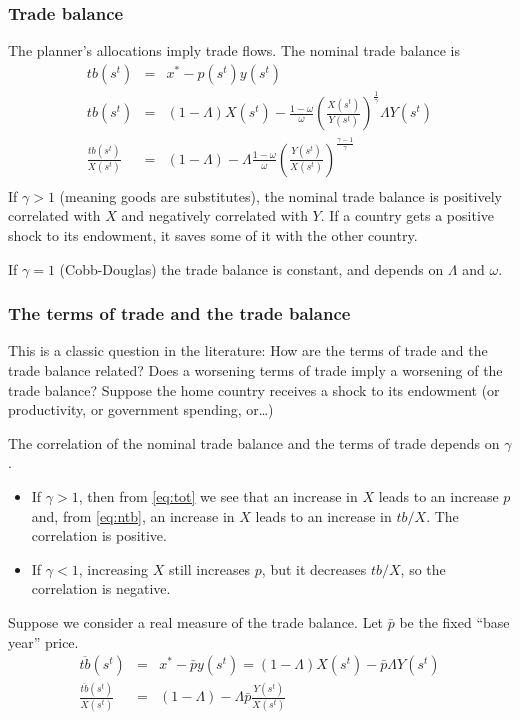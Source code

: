 \documentclass[11pt,pdftex,twoside,letterpaper]{exam}
\begin{document}
\subsubsection{Trade balance}
The planner's allocations imply trade flows. The nominal trade balance is
\begin{eqnarray}
  tb(s^t) &=& x^*-p(s^t)y(s^t)\\
  tb(s^t) &=& (1-\Lambda)X(s^t)-\frac{1-\omega}{\omega}\left(\frac{X(s^t)}{Y(s^t)}\right)^{\frac{1}{\gamma}}\Lambda Y(s^t)\\
  \frac{tb(s^t)}{X(s^t)} &=& (1-\Lambda)-\Lambda\frac{1-\omega}{\omega}\left(\frac{Y(s^t)}{X(s^t)}\right)^{\frac{\gamma-1}{\gamma}}\label{eq:ntb}\\
\end{eqnarray}
If $\gamma>1$ (meaning goods are substitutes), the nominal trade balance is positively correlated with $X$ and negatively correlated with $Y$.  If a country gets a positive shock to its endowment, it saves some of it with the other country.

If $\gamma=1$ (Cobb-Douglas) the trade balance is constant, and depends on $\Lambda$ and $\omega$.

\subsubsection{The terms of trade and the trade balance}
This is a classic question in the literature: How are the terms of trade and the trade balance related?  Does a worsening terms of trade imply a worsening of the trade balance? Suppose the home country receives a shock to its endowment (or productivity, or government spending, or\ldots)

The correlation of the nominal trade balance and the terms of trade depends on $\gamma$.
\begin{itemize}
\item If $\gamma>1$, then from \eqref{eq:tot} we see that an increase in $X$ leads to an increase $p$ and, from \eqref{eq:ntb}, an increase in $X$ leads to an increase in $tb/X$. The correlation is positive.

    \item If $\gamma <1$, increasing $X$ still increases $p$, but it decreases $tb/X$, so the correlation is negative.
\end{itemize}
Suppose we consider a real measure of the trade balance. Let $\bar{p}$ be the fixed ``base year'' price.
\begin{eqnarray}
  \overline{tb}(s^t) &=& x^*-\bar{p}y(s^t)=(1-\Lambda)X(s^t)-\bar{p}\Lambda Y(s^t)\\
  \frac{\overline{tb}(s^t)}{X(s^t)} &=& (1-\Lambda)-\Lambda\bar{p}\frac{Y(s^t)}{X(s^t)}
\end{eqnarray}
\end{document}
